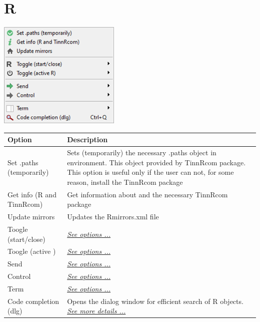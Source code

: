 
\hypertarget{menu_r}{}
\section{R}

\includegraphics[scale=0.50]{./res/menu_r.png}\\

\begin{scriptsize}
  \begin{tabularx}{\textwidth}{>{\hsize=0.5\hsize}X>{\hsize=0.7\hsize}X}\\
    \hline
    \textbf{Option} & \textbf{Description} \\
    \hline
    Set .paths (temporarily) & Sets (temporarily) the necessary .paths object in \RR{} environment.
     This object provided by TinnRcom package. This option is useful only if the user can not,
     for some reason, install the TinnRcom package \\
    Get info (R and TinnRcom) & Get information about \RR{} and the necessary TinnRcom package \\
    Update mirrors & Updates the Rmirrors.xml file \\
    \hdashline[1pt/1pt]
    Toogle (start/close) & \textit{\href{\#menu\_r\_toogle\_start}{See options ...}} \\
    Toogle (active \RR{}) & \textit{\href{\#menu\_r\_toogle\_active}{See options ...}} \\
    \hdashline[1pt/1pt]
    Send & \textit{\href{\#menu\_r\_send}{See options ...}} \\
    Control & \textit{\href{\#menu\_r\_control}{See options ...}} \\
    \hdashline[1pt/1pt]
    Term & \textit{\href{\#menu\_r\_term}{See options ...}} \\
    Code completion (dlg) & Opens the dialog window for efficient search of R objects.
    \textit{\href{\#additional_dialogs_code_completion}{See more details ...}} \\
    \hline
  \end{tabularx}
\end{scriptsize}

